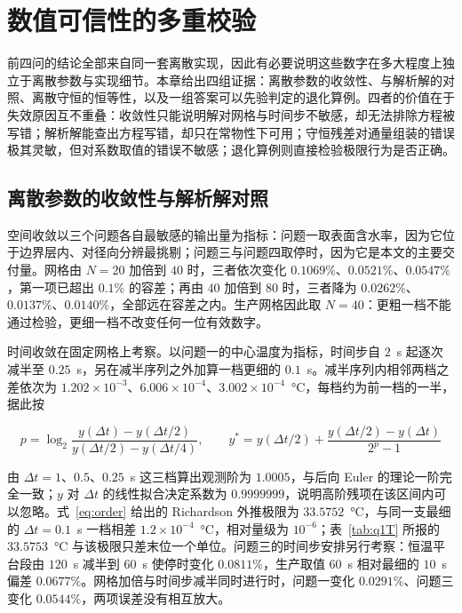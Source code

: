 \section{数值可信性的多重校验}

前四问的结论全部来自同一套离散实现，因此有必要说明这些数字在多大程度上独立于离散参数与实现细节。本章给出四组证据：离散参数的收敛性、与解析解的对照、离散守恒的恒等性，以及一组答案可以先验判定的退化算例。四者的价值在于失效原因互不重叠：收敛性只能说明解对网格与时间步不敏感，却无法排除方程被写错；解析解能查出方程写错，却只在常物性下可用；守恒残差对通量组装的错误极其灵敏，但对系数取值的错误不敏感；退化算例则直接检验极限行为是否正确。

\subsection{离散参数的收敛性与解析解对照}

空间收敛以三个问题各自最敏感的输出量为指标：问题一取表面含水率，因为它位于边界层内、对径向分辨最挑剔；问题三与问题四取停时，因为它是本文的主要交付量。网格由 $N=20$ 加倍到 $40$ 时，三者依次变化 $0.1069\%$、$0.0521\%$、$0.0547\%$，第一项已超出 $0.1\%$ 的容差；再由 $40$ 加倍到 $80$ 时，三者降为 $0.0262\%$、$0.0137\%$、$0.0140\%$，全部远在容差之内。生产网格因此取 $N=40$：更粗一档不能通过检验，更细一档不改变任何一位有效数字。

时间收敛在固定网格上考察。以问题一的中心温度为指标，时间步自 $2$~s 起逐次减半至 $0.25$~s，另在减半序列之外加算一档更细的 $0.1$~s。减半序列内相邻两档之差依次为 $1.202\times10^{-3}$、$6.006\times10^{-4}$、$3.002\times10^{-4}$~°C，每档约为前一档的一半，据此按

\begin{equation}
p=\log_2\frac{y(\Delta t)-y(\Delta t/2)}{y(\Delta t/2)-y(\Delta t/4)},
\qquad
y^{\ast}=y(\Delta t/2)+\frac{y(\Delta t/2)-y(\Delta t)}{2^{p}-1}
\label{eq:order}
\end{equation}

由 $\Delta t=1$、$0.5$、$0.25$~s 这三档算出观测阶为 $1.0005$，与后向 Euler 的理论一阶完全一致；$y$ 对 $\Delta t$ 的线性拟合决定系数为 $0.9999999$，说明高阶残项在该区间内可以忽略。式~\eqref{eq:order} 给出的 Richardson 外推极限为 $33.5752$~°C，与同一支最细的 $\Delta t=0.1$~s 一档相差 $1.2\times10^{-4}$~°C，相对量级为 $10^{-6}$；表~\ref{tab:q1T} 所报的 $33.5753$~°C 与该极限只差末位一个单位。问题三的时间步安排另行考察：恒温平台段由 $120$~s 减半到 $60$~s 使停时变化 $0.0811\%$，生产取值 $60$~s 相对最细的 $10$~s 偏差 $0.0677\%$。网格加倍与时间步减半同时进行时，问题一变化 $0.0291\%$、问题三变化 $0.0544\%$，两项误差没有相互放大。

